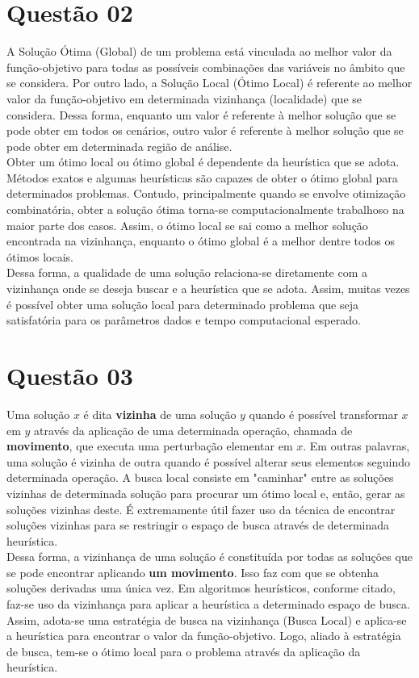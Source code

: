 	\section*{Questão 02}
	A Solução Ótima (Global) de um problema está vinculada ao melhor valor da função-objetivo
	para todas as possíveis combinações das variáveis no âmbito que se considera. Por outro lado,
	a Solução Local (Ótimo Local) é referente ao melhor valor da função-objetivo em determinada
	vizinhança (localidade) que se considera. Dessa forma, enquanto um valor é referente à melhor
	solução que se pode obter em todos os cenários, outro valor é referente à melhor solução que
	se pode obter em determinada região de análise.\\
	Obter um ótimo local ou ótimo global é dependente da heurística que se adota. Métodos exatos
	e algumas heurísticas são capazes de obter o ótimo global para determinados problemas. Contudo,
	principalmente quando se envolve otimização combinatória, obter a solução ótima torna-se computacionalmente
	trabalhoso na maior parte dos casos. Assim, o ótimo local se sai como a melhor solução encontrada na
	vizinhança, enquanto o ótimo global é a melhor dentre todos os ótimos locais.\\
	Dessa forma, a qualidade de uma solução relaciona-se diretamente com a vizinhança onde se
	deseja buscar e a heurística que se adota. Assim, muitas vezes é possível obter uma solução local
	para determinado problema que seja satisfatória para os parâmetros dados e tempo computacional
	esperado.

	\section*{Questão 03}
	Uma solução $x$ é dita \textbf{vizinha} de uma solução $y$ quando é possível transformar $x$ em
	$y$ através da aplicação de uma determinada operação, chamada de \textbf{movimento}, que executa
	uma perturbação elementar em $x$. Em outras palavras, uma solução é vizinha de outra quando é possível alterar seus elementos seguindo
	determinada operação. A busca local consiste em "caminhar" entre as soluções vizinhas de determinada solução para
	procurar um ótimo local e, então, gerar as soluções vizinhas deste. É extremamente útil fazer uso
	da técnica de encontrar soluções vizinhas para se restringir o espaço de busca através de determinada
	heurística.\\
	Dessa forma, a vizinhança de uma solução é constituída por todas as soluções que se pode encontrar
	aplicando \textbf{um movimento}. Isso faz com que se obtenha soluções derivadas uma única vez. Em
	algoritmos heurísticos, conforme citado, faz-se uso da vizinhança para aplicar a heurística a determinado
	espaço de busca. Assim, adota-se uma estratégia de busca na vizinhança (Busca Local) e aplica-se
	a heurística para encontrar o valor da função-objetivo. Logo, aliado à estratégia de busca, tem-se o
	ótimo local para o problema através da aplicação da heurística.

